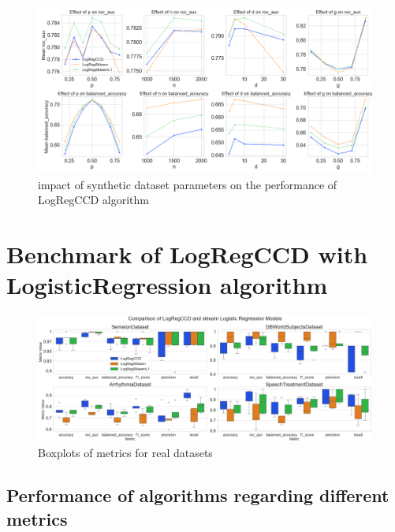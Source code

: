 \documentclass[12pt]{article}
\begin{document}
\begin{figure}[h]
    \centering
  \includegraphics[width=\textwidth]{../results/parameter_facet_grid.png}
    \caption{impact of synthetic dataset parameters on the performance of LogRegCCD algorithm}
    \label{fig:synthetic-dataset-parameters}
  \end{figure}

\section{Benchmark of LogRegCCD with LogisticRegression algorithm}


\begin{figure}[h]
    \centering
  \includegraphics[width=\textwidth]{../results/real_data_boxplots.png}
    \caption{Boxplots of metrics for real datasets}
    \label{fig:real-data-boxplots}
  \end{figure}


\subsection{Performance of algorithms regarding different metrics}
\end{document}
